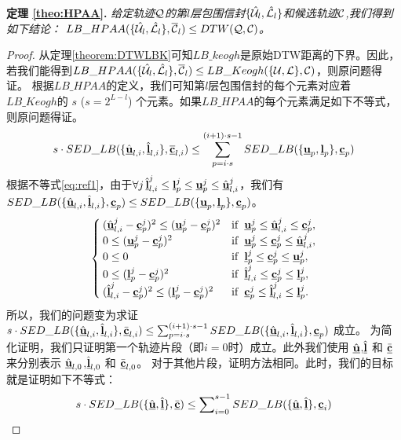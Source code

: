 \textbf{定理 \ref{theo:HPAA}. }{\em 	给定轨迹$\cal Q$的第$l$层包围信封$\{\hat{{\cal U}}_{l}, \hat{{\cal L}}_{l}\}$和候选轨迹$\cal C$,我们得到如下结论：
	$LB\_HPAA({  \{\hat{{\cal U}_{l}}, \hat{{\cal L}_{l}}\},\overline{{\cal C}}_{l}}) \le DTW(\cal Q, \cal C)$。}
\begin{proof}
	从定理\ref{theorem:DTWLBK}可知$LB\_keogh$是原始DTW距离的下界。因此，若我们能得到$LB\_HPAA({  \{\hat{{\cal U}_{l}}, \hat{{\cal L}_{l}}\},\overline{{\cal C}}_{l}}) \le LB\_Keogh({\{\cal U,\cal L\},{\cal C}}) $，则原问题得证。
根据$LB\_HPAA$的定义，我们可知第$l$层包围信封的每个元素对应着$LB\_Keogh$的 $s$ ($s=2^{L-l}$) 个元素。如果$LB\_HPAA$的每个元素满足如下不等式，则原问题得证。
	\begin{eqnarray}\label{eq:tmp1}
	s \cdot	SED\_LB(\{ \hat{\emph{{\textbf{u}}}}_{l,i}, \hat{\emph{{\textbf{l}}}}_{l,i} \}, \overline{\emph{{\textbf{c}}}}_{l,i}) \le
	\sum_{p=i \cdot s}^{(i+1)\cdot s-1} SED\_LB(\{{\emph{{\textbf{u}}}_{p}},\emph{{\textbf{l}}}_{p} \},\emph{{\textbf{c}}}_{p})\nonumber
	\end{eqnarray}
	根据不等式\ref{eq:ref1}，由于$\forall j \,  \hat{\emph{{\textbf{l}}}}_{l,i}^{j}\le \emph{{\textbf{l}}}_{p}^{j}\le \emph{{\textbf{u}}}_{p}^{j}\le \hat{\emph{{\textbf{u}}}}_{l,i}^{j}$，我们有$SED\_LB ( \{ \hat{\emph{{\textbf{u}}}}_{l,i}, \hat{\emph{{\textbf{l}}}}_{l,i} \}, \emph{{\textbf{c}}}_{p}) \le
	SED\_LB ( \{ {\emph{{\textbf{u}}}_{p}}, \emph{{\textbf{l}}}_{p} \}, \emph{{\textbf{c}}}_{p})$。
	\begin{equation}\label{eq:ref1}
	\begin{cases}
	(\hat{\emph{{\textbf{u}}}}_{l,i}^{j}- {\emph{{\textbf{c}}}}_{p}^{j})^2 \le ({\emph{{\textbf{u}}}}_{p}^{j} - {\emph{{\textbf{c}}}}_{p}^{j})^2 & {\rm if}  \,\,\,   \emph{{\textbf{u}}}_{p}^{j} \le  \hat{\emph{{\textbf{u}}}}_{l,i}^{j} \le {\emph{{\textbf{c}}}}_{p}^{j},  \\
	0	\le ({\emph{{\textbf{u}}}}_{p}^{j} - {\emph{{\textbf{c}}}}_{p}^{j})^2 &	{\rm if} \,\,\,   \emph{{\textbf{u}}}_{p}^{j} \le {\emph{{\textbf{c}}}}_{p}^{j} \le  \hat{\emph{{\textbf{u}}}}_{l,i}^{j},  \\
	0 \le 0 &	{\rm if}  \,\,\,     \emph{{\textbf{l}}}_{p}^{j} \le   {\emph{{\textbf{c}}}}_{p}^{j} \le    \emph{{\textbf{u}}}_{p}^{j},  \\
	0 \le ({\emph{{\textbf{l}}}}_{p}^{j} - {\emph{{\textbf{c}}}}_{p}^{j})^2 &	{\rm if} \,\,\,   \hat{\emph{{\textbf{l}}}}_{l,i}^{j} \le   {\emph{{\textbf{c}}}}_{p}^{j} \le  \emph{{\textbf{l}}}_{p}^{j},  \\
	(\hat{\emph{{\textbf{l}}}}_{l,i}^{j}- {\emph{{\textbf{c}}}}_{p}^{j})^2 \le ({\emph{{\textbf{l}}}}_{p}^{j} - {\emph{{\textbf{c}}}}_{p}^{j})^2 & {\rm if}  \,\,\,  {\emph{{\textbf{c}}}}_{p}^{j} \le \hat{\emph{{\textbf{l}}}}_{l,i}^{j} \le  \emph{{\textbf{l}}}_{p}^{j}.
	\end{cases}
	\end{equation}
	所以，我们的问题变为求证$s \cdot	SED\_LB(\{ \hat{\emph{{\textbf{u}}}}_{l,i}, \hat{\emph{{\textbf{l}}}}_{l,i} \}, \bar{\emph{{\textbf{c}}}}_{l,i})  \le	\sum_{p=i \cdot s}^{(i+1)\cdot s-1} SED\_LB(\{ \hat{\emph{{\textbf{u}}}}_{l,i}, \hat{\emph{{\textbf{l}}}}_{l,i} \}, \emph{{\textbf{c}}}_{p})$ 成立。
为简化证明，我们只证明第一个轨迹片段（即$i=0$时）成立。此外我们使用  $\hat{\emph{{\textbf{u}}}}$,$\hat{\emph{{\textbf{l}}}}$ 和 $\bar{\emph{{\textbf{c}}}}$ 来分别表示  $\hat{\emph{{\textbf{u}}}}_{l,0}$,$\hat{\emph{{\textbf{l}}}}_{l,0}$ 和 $\bar{\emph{{\textbf{c}}}}_{l,0}$。 对于其他片段，证明方法相同。此时，我们的目标就是证明如下不等式：
	\begin{eqnarray}\label{eq:transZero}
	s	\cdot	SED\_LB(\{ \hat{\emph{{\textbf{u}}}}, \hat{\emph{{\textbf{l}}}} \}, \bar{\emph{{\textbf{c}}}}) \le \sum\nolimits_{i=0}^{s-1}SED\_LB(\{ \hat{\emph{{\textbf{u}}}}, \hat{\emph{{\textbf{l}}}} \}, \emph{{\textbf{c}}}_{i})
	\end{eqnarray}
	

\end{proof}
